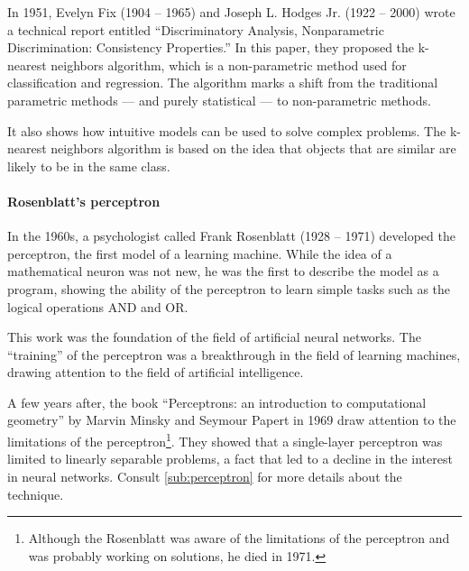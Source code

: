 In 1951, Evelyn Fix (1904 -- 1965) and Joseph L. Hodges Jr. (1922 -- 2000) wrote a
technical report entitled ``Discriminatory Analysis, Nonparametric Discrimination:
Consistency Properties.''  In this paper, they proposed the k-nearest neighbors algorithm,
which is a non-parametric method used for classification and regression.  The algorithm
marks a shift from the traditional parametric methods --- and purely statistical ---
to non-parametric methods.

It also shows how intuitive models can be used to solve complex problems.  The k-nearest
neighbors algorithm is based on the idea that objects that are similar are likely to be in
the same class.


\paragraph{Rosenblatt's perceptron}

In the 1960s, a psychologist called Frank Rosenblatt (1928 -- 1971) developed the perceptron, the first model of
a learning machine.  While the idea of a mathematical neuron was not new, he was the first
to describe the model as a program, showing the ability of the perceptron to learn simple
tasks such as the logical operations AND and OR.

This work was the foundation of the field of artificial neural networks.  The ``training''
of the perceptron was a breakthrough in the field of learning machines, drawing attention
to the field of artificial intelligence.


A few years after, the book ``Perceptrons: an introduction to computational geometry'' by
Marvin Minsky and Seymour Papert in 1969 draw attention to the limitations of the
perceptron\footnote{Although the Rosenblatt was aware of the limitations of the perceptron
and was probably working on solutions, he died in 1971.}. They showed that a single-layer
perceptron was limited to linearly separable problems, a fact that led to a decline in the
interest in neural networks.
Consult \cref{sub:perceptron} for more details about the technique.

